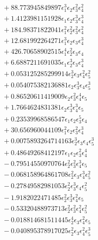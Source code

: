 \documentclass[10pt]{article}
\begin{document}
\begin{align*}
&{}  + 88.773945849897 \epsilon_{1}^{3} \epsilon_{2} \epsilon_{3}^{2} \epsilon_{4}^{2} \\
&{}  + 1.4123981151928 \epsilon_{1} \epsilon_{2} \epsilon_{3}^{3} \epsilon_{4}^{3} \\
&{}  + 184.98371822041 \epsilon_{1}^{2} \epsilon_{2}^{2} \epsilon_{3}^{2} \epsilon_{4}^{2} \\
&{}  + 12.681992264271 \epsilon_{1}^{3} \epsilon_{2} \epsilon_{3} \epsilon_{4}^{3} \\
&{}  + 426.70658902515 \epsilon_{1}^{4} \epsilon_{2}^{2} \epsilon_{3} \epsilon_{4} \\
&{}  + 6.6887211691035 \epsilon_{1} \epsilon_{2}^{3} \epsilon_{3} \epsilon_{4}^{3} \\
&{}  + 0.053125285299914 \epsilon_{2}^{3} \epsilon_{3} \epsilon_{4}^{2} \epsilon_{5}^{2} \\
&{}  + 0.054075382136881 \epsilon_{2} \epsilon_{3}^{3} \epsilon_{4} \epsilon_{5}^{3} \\
&{}  + 0.86520611419009 \epsilon_{2} \epsilon_{3}^{2} \epsilon_{4}^{4} \epsilon_{5} \\
&{}  + 1.7664624831381 \epsilon_{2} \epsilon_{3}^{3} \epsilon_{4}^{3} \epsilon_{5} \\
&{}  + 0.23539968586547 \epsilon_{1} \epsilon_{2} \epsilon_{3}^{5} \epsilon_{4} \\
&{}  + 30.656960044109 \epsilon_{1}^{2} \epsilon_{2} \epsilon_{3}^{2} \epsilon_{4}^{3} \\
&{}  + 0.0075893264714163 \epsilon_{2}^{3} \epsilon_{3} \epsilon_{4} \epsilon_{5}^{3} \\
&{}  + 0.48649268412197 \epsilon_{1} \epsilon_{2} \epsilon_{3}^{2} \epsilon_{4}^{4} \\
&{}  - 0.79514550970764 \epsilon_{2}^{2} \epsilon_{3}^{2} \epsilon_{4}^{3} \epsilon_{5} \\
&{}  - 0.068158964861708 \epsilon_{2}^{2} \epsilon_{3} \epsilon_{4}^{3} \epsilon_{5}^{2} \\
&{}  - 0.27849582981053 \epsilon_{2}^{2} \epsilon_{3}^{3} \epsilon_{4} \epsilon_{5}^{2} \\
&{}  - 1.9182022471485 \epsilon_{2}^{2} \epsilon_{3}^{3} \epsilon_{4}^{2} \epsilon_{5} \\
&{}  - 0.53320488973713 \epsilon_{2}^{2} \epsilon_{3}^{2} \epsilon_{4}^{2} \epsilon_{5}^{2} \\
&{}  - 0.018814681511445 \epsilon_{2}^{4} \epsilon_{3} \epsilon_{4}^{2} \epsilon_{5} \\
&{}  - 0.040895378917025 \epsilon_{2}^{2} \epsilon_{3} \epsilon_{4}^{2} \epsilon_{5}^{3} \\

\end{align*}
\end{document}
